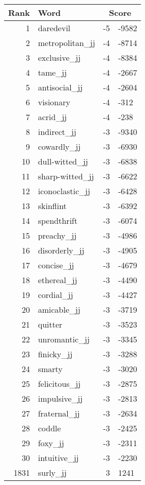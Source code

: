 \begin{longtable}[!htbp]{| rlr@{.}l |}
    \hline
    \textbf{Rank} & \textbf{Word} & \multicolumn{2}{c|}{\textbf{Score}} \\
    \hline
    \endhead
    1 & daredevil & -5 & -9582 \\
    2 & metropolitan\_jj & -4 & -8714 \\
    3 & exclusive\_jj & -4 & -8384 \\
    4 & tame\_jj & -4 & -2667 \\
    5 & antisocial\_jj & -4 & -2604 \\
    6 & visionary & -4 & -312 \\
    7 & acrid\_jj & -4 & -238 \\
    8 & indirect\_jj & -3 & -9340 \\
    9 & cowardly\_jj & -3 & -6930 \\
    10 & dull-witted\_jj & -3 & -6838 \\
    11 & sharp-witted\_jj & -3 & -6622 \\
    12 & iconoclastic\_jj & -3 & -6428 \\
    13 & skinflint & -3 & -6392 \\
    14 & spendthrift & -3 & -6074 \\
    15 & preachy\_jj & -3 & -4986 \\
    16 & disorderly\_jj & -3 & -4905 \\
    17 & concise\_jj & -3 & -4679 \\
    18 & ethereal\_jj & -3 & -4490 \\
    19 & cordial\_jj & -3 & -4427 \\
    20 & amicable\_jj & -3 & -3719 \\
    21 & quitter & -3 & -3523 \\
    22 & unromantic\_jj & -3 & -3345 \\
    23 & finicky\_jj & -3 & -3288 \\
    24 & smarty & -3 & -3020 \\
    25 & felicitous\_jj & -3 & -2875 \\
    26 & impulsive\_jj & -3 & -2813 \\
    27 & fraternal\_jj & -3 & -2634 \\
    28 & coddle & -3 & -2425 \\
    29 & foxy\_jj & -3 & -2311 \\
    30 & intuitive\_jj & -3 & -2230 \\
    1831 & surly\_jj & 3 & 1241 \\

\end{longtable}
